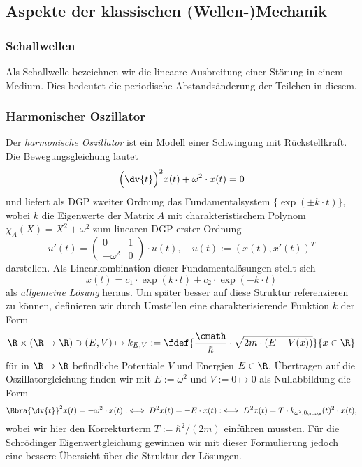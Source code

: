 \documentclass[../main.tex]{subfiles}
\begin{document}
    \subsection{Aspekte der klassischen (Wellen-)Mechanik}
        \subsubsection{Schallwellen}
            Als Schallwelle bezeichnen wir die lineaere Ausbreitung einer Störung in einem Medium. Dies bedeutet die periodische Abstandsänderung der Teilchen in diesem. 

        \subsubsection{Harmonischer Oszillator}
            Der \emph{harmonische Oszillator} ist ein Modell einer Schwingung mit Rückstellkraft. Die Bewegungsgleichung lautet
            \[
                \Bigl(\dv{t}\Bigr)^2x(t) + \omega^2\cdot x(t) = 0
            \]
            und liefert als DGP zweiter Ordnung das Fundamentalsystem $\{\exp(\pm k\cdot t)\}$, wobei $k$ die Eigenwerte der Matrix $A$ mit charakteristischem Polynom $\chi_A(X) = X^2 + \omega^2$ zum linearen DGP erster Ordnung
            \[
                u'(t) = \begin{pmatrix}
                    0 & 1\\
                    -\omega^2 & 0
                \end{pmatrix}\cdot u(t),\quad u(t):=(x(t), x'(t))^T
            \]
            darstellen. Als Linearkombination dieser Fundamentalösungen stellt sich 
            \[
                x(t) = c_1\cdot\exp(k\cdot t) + c_2\cdot\exp(-k\cdot t)   
            \]
            als \emph{allgemeine Lösung} heraus. Um später besser auf diese Struktur referenzieren zu können, definieren wir durch Umstellen eine charakterisierende Funktion $k$ der Form
            \[
                \R\times(\R\to\R)\ni(E,V)\mapsto k_{E,V}:=\fdef{\frac{\cmath}{\hbar}\cdot\sqrt{2m\cdot(E - V(x))}}{x\in\R}
            \] 
            für in $\R\to\R$ befindliche Potentiale $V$ und Energien $E\in\R$. Übertragen auf die Oszillatorgleichung finden wir mit $E:=\omega^2$ und $V:=0\mapsto 0$ als Nullabbildung die Form
            \[
                \Bbra{\dv{t}}^2x(t) = -\omega^2\cdot x(t) :\iff D^2x(t) = -E\cdot x(t) :\iff D^2x(t) = T\cdot k_{\omega^2,0_{\R\to\R}}(t)^2\cdot x(t),
            \]
            wobei wir hier den Korrekturterm $T:=\hbar^2/(2m)$ einführen mussten. Für die Schrödinger Eigenwertgleichung gewinnen wir mit dieser Formulierung jedoch eine bessere Übersicht über die Struktur der Lösungen.
\end{document}
